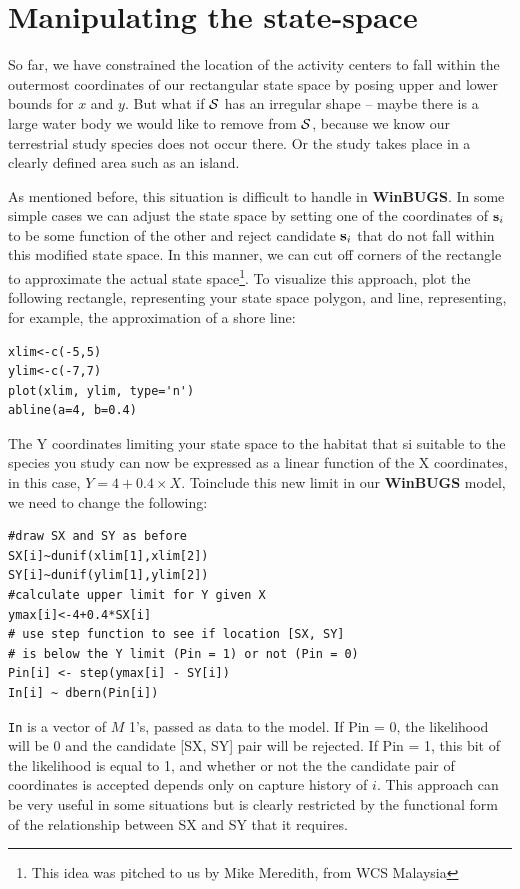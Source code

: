 \section{Manipulating the state-space}
\label{mcmc.sec.state-space}

So far, we have constrained the location of the activity centers to fall
within the outermost coordinates of our rectangular state space by posing 
upper and lower bounds for $x$ and $y$. But what if ${\cal S}$ 
has an irregular 
shape -- maybe there is a large water body we would like to remove from 
${\cal S}$, because we know our terrestrial study species does not occur there.
Or the study takes place in a clearly defined area such as an island. 

As mentioned before, this situation is difficult to handle in {\bf WinBUGS}.
In some simple cases we can adjust the state space by setting one of the
coordinates of ${\bf s}_{i}$ to be some function of the other and reject candidate ${\bf s}_{i}$ that do not fall within this modified state space. 
In this manner, we can cut off corners of the rectangle to approximate 
the actual state space\footnote{This idea was pitched to us by Mike Meredith, from WCS Malaysia}. To visualize this approach, plot the following rectangle, representing your state space polygon, and line, representing, for example, the approximation of a shore line:
\begin{verbatim}
xlim<-c(-5,5)
ylim<-c(-7,7)
plot(xlim, ylim, type='n')
abline(a=4, b=0.4)
\end{verbatim}
The Y coordinates limiting your state space to the habitat that si suitable to the species you study can now be expressed as a linear function of the X coordinates, in this case, $Y=4+0.4 \times X$.
Toinclude this new limit in our {\bf WinBUGS} model, we need to change the following:
\begin{verbatim}
#draw SX and SY as before
SX[i]~dunif(xlim[1],xlim[2])
SY[i]~dunif(ylim[1],ylim[2])
#calculate upper limit for Y given X
ymax[i]<-4+0.4*SX[i]
# use step function to see if location [SX, SY] 
# is below the Y limit (Pin = 1) or not (Pin = 0)
Pin[i] <- step(ymax[i] - SY[i])
In[i] ~ dbern(Pin[i])
\end{verbatim}
{\tt In} is a vector of $M$ 1's, passed as data to the model. If Pin = 0, the likelihood will be 0 and the candidate [SX, SY] pair will be rejected. If Pin = 1, this bit of the likelihood is equal to 1, and whether or not the the candidate pair of coordinates is accepted depends only on capture history of $i$. This approach can be very useful in some situations but is clearly restricted by the functional form of the relationship between SX and SY that it requires.

